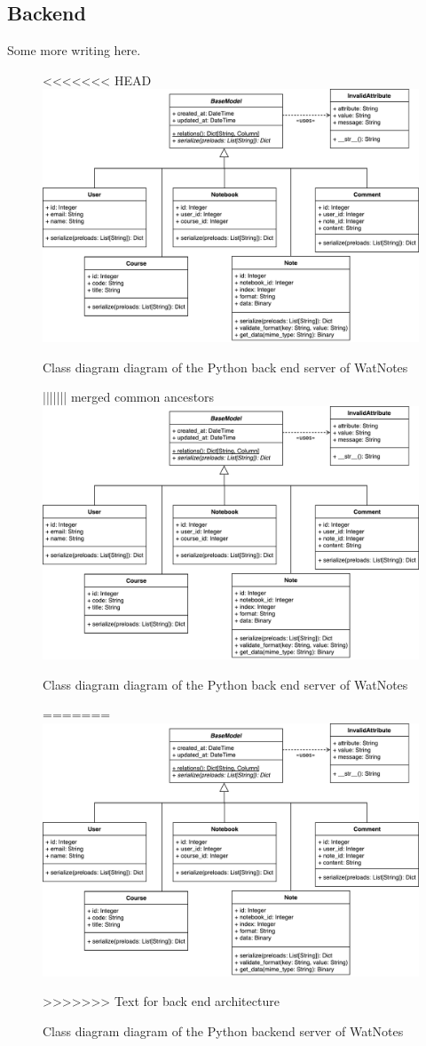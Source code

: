\documentclass[12pt]{article}
\begin{document}
  \subsection{Backend}
    Some more writing here.
    \begin{figure}[H]
<<<<<<< HEAD
      \includegraphics[width=\textwidth]{assets/backend-class.pdf}
      \caption{Class diagram diagram of the Python back end server of WatNotes}
||||||| merged common ancestors
      \includegraphics{assets/backend-class.pdf}
      \caption{Class diagram diagram of the Python back end server of WatNotes}
=======
      \includegraphics{assets/backend-class.pdf}
      \caption{Class diagram diagram of the Python backend server of WatNotes}
>>>>>>> Text for back end architecture
    \end{figure}
\end{document}
